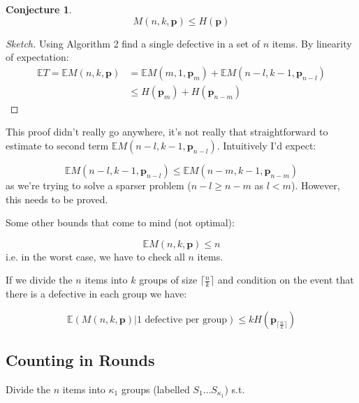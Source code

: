 \documentclass[11pt]{article}
\renewcommand{\vec}[1]{\mathbf{#1}}
\newtheorem{conj}{Conjecture}[section]
\theoremstyle{plain}
\newtheorem{conj}[theorem]{Conjecture}
\begin{document}
\begin{conj}
\begin{equation}
M\left(n,k,\vec{p}\right) \leq H\left(\vec{p}\right)
\end{equation}
\end{conj}

\begin{proof}[Sketch]
Using Algorithm 2 find a single defective in a set of \(n\) items. By linearity of expectation:
\begin{align}
\mathbb{E}T = \mathbb{E}M\left(n,k,\vec{p}\right) &= \mathbb{E}M\left(m,1,\vec{p}_m\right) + \mathbb{E}M\left(n-l,k-1,\vec{p}_{n-l}\right) \\
&\leq H\left(\vec{p}_m\right) + H\left(\vec{p}_{n-m}\right)
\end{align}
\end{proof}
This proof didn't really go anywhere, it's not really that straightforward to estimate to second term \(\mathbb{E}M\left(n-l,k-1,\vec{p}_{n-l}\right) \). Intuitively I'd expect:

\begin{equation}
\mathbb{E}M\left(n-l,k-1,\vec{p}_{n-l}\right) \leq \mathbb{E}M\left(n-m,k-1,\vec{p}_{n-m}\right) 
\end{equation}
as we're trying to solve a sparser problem (\(n-l \geq n-m\) as \(l<m\)). However, this needs to be proved. 

Some other bounds that come to mind (not optimal):

\begin{equation}
\mathbb{E}M\left(n,k,\vec{p}\right) \leq n
\end{equation}
i.e. in the worst case, we have to check all \(n\) items. 

If we divide the \(n\) items into \(k\) groups of size \(\lceil\frac{n}{k}\rceil\) and condition on the event that there is a defective in each group we have:

\begin{equation}
\mathbb{E}\left(M\left(n,k,\vec{p}\right)|\text{1 defective per group}\right) \leq k H\left( \vec{p}_{\lceil \frac{n}{k} \rceil }\right)
\end{equation}

\subsection{Counting in Rounds}
Divide the \(n\) items into \(\kappa_1\) groups (labelled \(S_1 \ldots S_{\kappa_1}\)) s.t. 
\end{document}
